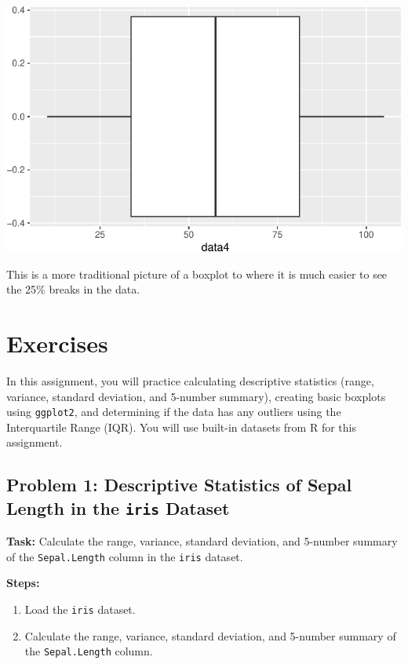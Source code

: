 \documentclass[
  letterpaper,
  DIV=11,
  numbers=noendperiod]{scrreprt}
\providecommand{\tightlist}{%
  \setlength{\itemsep}{0pt}\setlength{\parskip}{0pt}}\usepackage{longtable,booktabs,array}
\begin{document}
\includegraphics{Measures_of_Variability_files/figure-pdf/unnamed-chunk-14-1.pdf}

This is a more traditional picture of a boxplot to where it is much
easier to see the 25\% breaks in the data.

\section*{Exercises}\label{exercises-10}


In this assignment, you will practice calculating descriptive statistics
(range, variance, standard deviation, and 5-number summary), creating
basic boxplots using \texttt{ggplot2}, and determining if the data has
any outliers using the Interquartile Range (IQR). You will use built-in
datasets from R for this assignment.

\subsection*{\texorpdfstring{Problem 1: Descriptive Statistics of Sepal
Length in the \texttt{iris}
Dataset}{Problem 1: Descriptive Statistics of Sepal Length in the iris Dataset}}\label{problem-1-descriptive-statistics-of-sepal-length-in-the-iris-dataset}

\textbf{Task:} Calculate the range, variance, standard deviation, and
5-number summary of the \texttt{Sepal.Length} column in the
\texttt{iris} dataset.

\textbf{Steps:}

\begin{enumerate}
\def\labelenumi{\arabic{enumi}.}
\tightlist
\item
  Load the \texttt{iris} dataset.
\item
  Calculate the range, variance, standard deviation, and 5-number
  summary of the \texttt{Sepal.Length} column.
\end{enumerate}
\end{document}
